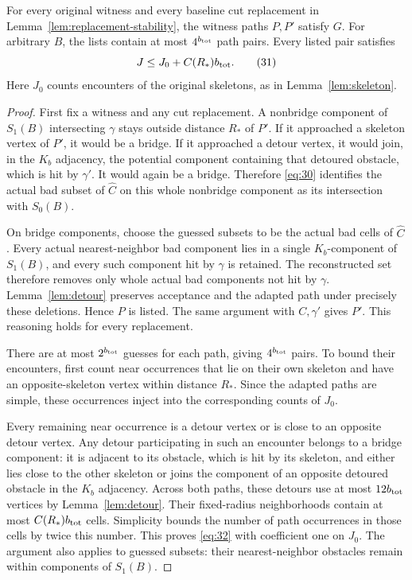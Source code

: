 \begin{lemma}\label{lem:path-lists}
For every original witness and every baseline cut replacement in
Lemma~\ref{lem:replacement-stability}, the witness paths $P,P'$ satisfy
$G$. For arbitrary $B$, the lists contain at most $4^{b_{\rm tot}}$
path pairs. Every listed pair satisfies
\[
                       J\le J_0+C(R_*)b_{\rm tot}.
                       \tag{31}\label{eq:32}
\]
Here $J_0$ counts encounters of the original skeletons, as in
Lemma~\ref{lem:skeleton}.
\end{lemma}
\begin{proof}
First fix a witness and any cut replacement. A nonbridge component of
$S_1(B)$ intersecting $\gamma$ stays outside distance $R_*$ of $P'$.
If it approached a skeleton vertex of $P'$, it would be a bridge. If it
approached a detour vertex, it would join, in the $K_b$ adjacency, the
potential component containing that detoured obstacle, which is hit by
$\gamma'$. It would again be a bridge. Therefore \eqref{eq:30} identifies
the actual bad subset of $\widehat C$ on this whole nonbridge component
as its intersection with $S_0(B)$.

On bridge components, choose the guessed subsets to be the actual bad
cells of $\widehat C$. Every actual nearest-neighbor bad component lies
in a single $K_b$-component of $S_1(B)$, and every such component hit by
$\gamma$ is retained. The reconstructed set therefore removes only whole
actual bad components not hit by $\gamma$. Lemma~\ref{lem:detour}
preserves acceptance and the adapted path under precisely these
deletions. Hence $P$ is listed. The same argument with $C,\gamma'$
gives $P'$. This reasoning holds for every replacement.

There are at most $2^{b_{\rm tot}}$ guesses for each path, giving
$4^{b_{\rm tot}}$ pairs. To bound their encounters, first count near
occurrences that lie on their own skeleton and have an opposite-skeleton
vertex within distance $R_*$. Since the adapted paths are simple, these
occurrences inject into the corresponding counts of $J_0$.

Every remaining near occurrence is a detour vertex or is close to an
opposite detour vertex. Any detour participating in such an encounter
belongs to a bridge component: it is adjacent to its obstacle, which
is hit by its skeleton, and either lies close to the other skeleton or
joins the component of an opposite detoured obstacle in the $K_b$
adjacency. Across both paths, these detours use at most $12b_{\rm tot}$
vertices by Lemma~\ref{lem:detour}. Their fixed-radius neighborhoods
contain at most $C(R_*)b_{\rm tot}$ cells. Simplicity bounds the number
of path occurrences in those cells by twice this number. This proves
\eqref{eq:32} with coefficient one on $J_0$. The argument also applies
to guessed subsets: their nearest-neighbor obstacles remain within
components of $S_1(B)$.
\end{proof}

